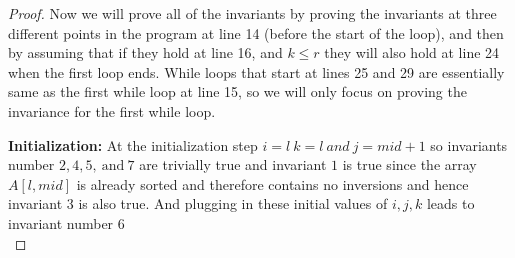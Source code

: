 \documentclass{article}
\begin{document}
{\begin {proof}
        Now we will prove all of the invariants by proving the invariants at three different points in the program at line 14 (before the start of the loop), and then by assuming that if they hold at line 16, and $k \leq r$ they will also hold at line 24 when the first loop ends. While loops that start at lines 25 and 29 are essentially same as the first while loop at line 15, so we will only focus on proving the invariance for the first while loop. \\
        \newpage
        
        \textbf{Initialization:} At the initialization step $i = l\ k = l\ and\ j = mid+1$ so invariants number $2, 4, 5,\ \text {and}\ 7$ are trivially true and invariant $1$ is true since the array $A[l, mid]$ is already sorted and therefore contains no inversions and hence invariant $3$ is also true. And plugging in these initial values of $i,j,k $ leads to invariant number $6$\\
        

\end{proof}}
\end{document}
